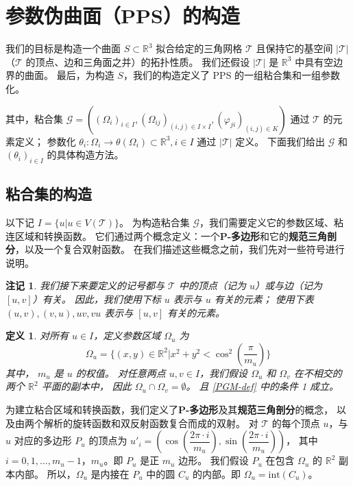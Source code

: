 \documentclass{ctexart}
\newtheorem{Def}{定义}
\newtheorem{Rmk}{注记}
\begin{document}
\section{参数伪曲面（PPS）的构造}
	我们的目标是构造一个曲面 $S\subset \mathbb{R}^3$ 拟合给定的三角网格 $\mathcal{T}$
	且保持它的基空间 $|\mathcal{T}|$ （$\mathcal{T}$ 的顶点、边和三角面之并）的拓扑性质。
	我们还假设 $|\mathcal{T}|$ 是 $\mathbb{R}^3$ 中具有空边界的曲面。
	最后，为构造 $S$，我们的构造定义了 PPS 的一组粘合集和一组参数化。

	其中，粘合集
	$\mathcal{G} = ((\Omega_i)_{i\in I},(\Omega_{ij})_{(i,j)\in I\times I},(\varphi_{ji})_{(i,j)\in K})$
	通过 $\mathcal{T}$ 的元素定义；
	参数化 $\theta_i:\Omega_i\rightarrow \theta(\Omega_i)\subset \mathbb{R}^3,i\in I$
	通过 $|\mathcal{T}|$ 定义。
	下面我们给出 $\mathcal{G}$ 和 $(\theta_i)_{i\in I}$ 的具体构造方法。

	\subsection{粘合集的构造}
		以下记 $I=\{u|u \in V(\mathcal{T})\}$。
		为构造粘合集 $\mathcal{G}$，我们需要定义它的参数区域、粘连区域和转换函数。
		它们通过两个概念定义：一个\textbf{P-多边形}和它的\textbf{规范三角剖分}，以及一个复合双射函数。
		在我们描述这些概念之前，我们先对一些符号进行说明。

		\begin{Rmk}
			我们接下来要定义的记号都与 $\mathcal{T}$ 中的顶点（记为 $u$）或与边（记为 $[u,v]$）有关。
			因此，我们使用下标 $u$ 表示与 $u$ 有关的元素；
			使用下表 $(u,v),(v,u),uv,vu$ 表示与 $[u,v]$ 有关的元素。
		\end{Rmk}

		\begin{Def}
			对所有 $u\in I$，定义参数区域 $\Omega_u$ 为
			\begin{equation}
				\Omega_u=\{(x,y)\in \mathbb{R}^2|x^2+y^2<\cos^2(\dfrac{\pi}{m_u})\}
			\end{equation}
			其中， $m_u$ 是 $u$ 的权值。
			对任意两点 $u,v\in I$，我们假设 $\Omega_u$ 和 $\Omega_v$ 在不相交的两个 $\mathbb{R}^2$ 平面的副本中，
			因此 $\Omega_u\cap \Omega_v=\emptyset$。
			且 \ref{PGM-def} 中的条件 1 成立。
		\end{Def}
		
		为建立粘合区域和转换函数，我们定义了\textbf{P-多边形}及其\textbf{规范三角剖分}的概念，
		以及由两个解析的旋转函数和双反射函数复合而成的双射。
		对 $\mathcal{T}$ 的每个顶点 $u$，与 $u$ 对应的多边形 $P_u$ 的顶点为
		$u'_i=(\cos(\dfrac{2\pi \cdot i}{m_u}),\sin(\dfrac{2\pi \cdot i}{m_u}))$，
		其中 $i=0,1,\dots,m_u-1$，$m_u$。即 $P_u$ 是正 $m_u$ 边形。
		我们假设 $P_u$ 在包含 $\Omega_u$ 的 $\mathbb{R}^2$ 副本内部。
		所以，$\Omega_u$ 是内接在 $P_u$ 中的圆 $C_u$ 的内部。即 $\Omega_u = \text{int}(C_u)$。
\end{document}
